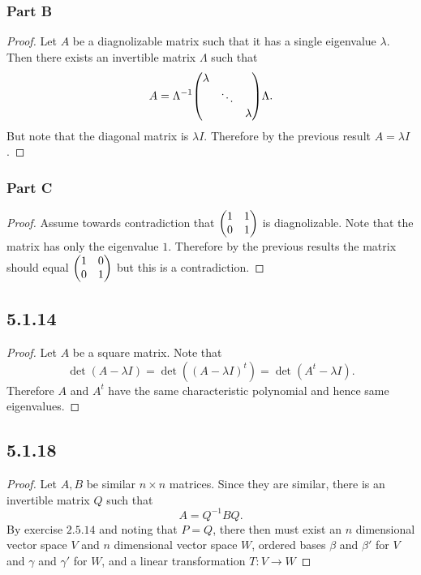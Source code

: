 \documentclass[12pt,titlepage]{extarticle}
\begin{document}
\subsubsection*{Part B}
\begin{proof}
    Let $A$ be a diagnolizable matrix such that it has a single eigenvalue $\lambda$. Then there exists an invertible matrix $\Lambda$ such that
    \[
        A = \Lambda^{-1} \mqty(\dmat{\lambda, \ddots, \lambda}) \Lambda
    .\]
    But note that the diagonal matrix is $\lambda I$. Therefore by the previous result $A = \lambda I$.
\end{proof}

\subsubsection*{Part C}
\begin{proof}
    Assume towards contradiction that $\mqty(1 & 1 \\ 0 & 1)$ is diagnolizable. Note that the matrix has only the eigenvalue $1$. Therefore by the previous results the matrix should equal $\mqty(1 & 0 \\ 0 & 1)$ but this is a contradiction.
\end{proof}

\subsection*{5.1.14}
\begin{proof}
    Let $A$ be a square matrix. Note that
    \[
        \det(A - \lambda I) = \det((A - \lambda I)^t) = \det(A^t - \lambda I)
    .\]
    Therefore $A$ and $A^t$ have the same characteristic polynomial and hence same eigenvalues.
\end{proof}

\subsection*{5.1.18}
\begin{proof}
    Let $A,B$ be similar $n\times n$ matrices. Since they are similar, there is an invertible matrix $Q$ such that
    \[
        A = Q^{-1} B Q
    .\]
    By exercise $2.5.14$ and noting that $P = Q$, there then must exist an $n$ dimensional vector space $V$ and $n$ dimensional vector space $W$, ordered bases $\beta$ and $\beta'$ for $V$ and $\gamma$ and $\gamma'$ for $W$, and a linear transformation $T : V \to W$
\end{proof}
\end{document}
